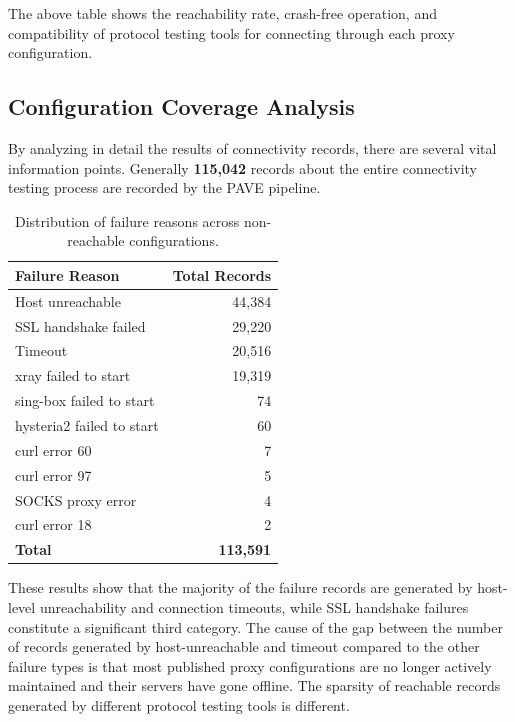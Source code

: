 \documentclass[10pt,conference]{IEEEtran}
\begin{document}
The above table shows the reachability rate, crash-free operation, and compatibility of protocol testing tools for connecting through each proxy configuration.

\subsection{Configuration Coverage Analysis}
By analyzing in detail the results of connectivity records, there are several vital information points.
Generally \textbf{115,042} records about the entire connectivity testing process are recorded by the PAVE pipeline.

\begin{table}[t]
\centering
\caption{Distribution of failure reasons across non-reachable configurations.}
\label{tab:failure_reason_distribution}
\renewcommand{\arraystretch}{1.2}
\begin{tabular}{l r}
\hline
\textbf{Failure Reason} & \textbf{Total Records} \\
\hline
Host unreachable             & 44,384 \\
SSL handshake failed         & 29,220 \\
Timeout                      & 20,516 \\
xray failed to start         & 19,319 \\
sing-box failed to start     &     74 \\
hysteria2 failed to start    &     60 \\
curl error 60                &      7 \\
curl error 97                &      5 \\
SOCKS proxy error            &      4 \\
curl error 18                &      2 \\
\hline
\textbf{Total}               & \textbf{113,591} \\
\hline
\end{tabular}
\end{table}

These results show that the majority of the failure records are generated by host-level unreachability and connection timeouts, while SSL handshake failures constitute a significant third category.
The cause of the gap between the number of records generated by host-unreachable and timeout compared to the other failure types is that most published proxy configurations are no longer actively maintained and their servers have gone offline.
The sparsity of reachable records generated by different protocol testing tools is different.
\end{document}

